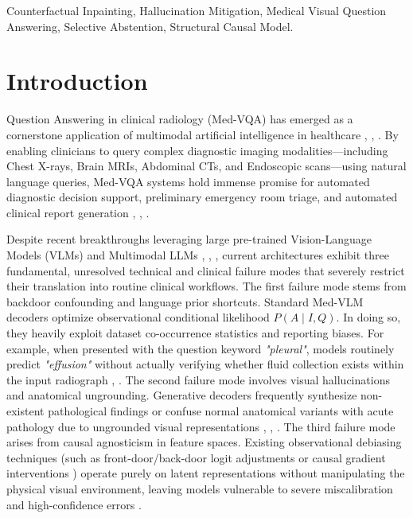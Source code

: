 \documentclass[journal,twoside,web]{ieeecolor}
\begin{document}
\begin{IEEEkeywords}
Counterfactual Inpainting, Hallucination Mitigation, Medical Visual Question Answering, Selective Abstention, Structural Causal Model.
\end{IEEEkeywords}

\section{Introduction}
\label{sec:introduction}
 Question Answering in clinical radiology (Med-VQA) has emerged as a cornerstone application of multimodal artificial intelligence in healthcare \cite{rubin2019}, \cite{hu2024omnimedvqa}, \cite{yu2025finegrained}. By enabling clinicians to query complex diagnostic imaging modalities---including Chest X-rays, Brain MRIs, Abdominal CTs, and Endoscopic scans---using natural language queries, Med-VQA systems hold immense promise for automated diagnostic decision support, preliminary emergency room triage, and automated clinical report generation \cite{gale2020}, \cite{yan2024tokenmixer}, \cite{wang2024chatcadplus}.

Despite recent breakthroughs leveraging large pre-trained Vision-Language Models (VLMs) and Multimodal LLMs \cite{li2022}, \cite{chen2025mimo}, \cite{li2025mvcm}, current architectures exhibit three fundamental, unresolved technical and clinical failure modes that severely restrict their translation into routine clinical workflows. The first failure mode stems from backdoor confounding and language prior shortcuts. Standard Med-VLM decoders optimize observational conditional likelihood $P(A \mid I, Q)$. In doing so, they heavily exploit dataset co-occurrence statistics and reporting biases. For example, when presented with the question keyword \emph{"pleural"}, models routinely predict \emph{"effusion"} without actually verifying whether fluid collection exists within the input radiograph \cite{zhu2025medbiasx}, \cite{wang2024mmql}. The second failure mode involves visual hallucinations and anatomical ungrounding. Generative decoders frequently synthesize non-existent pathological findings or confuse normal anatomical variants with acute pathology due to ungrounded visual representations \cite{liao2025vase}, \cite{heiman2025factchexcker}, \cite{wan2025decoct}. The third failure mode arises from causal agnosticism in feature spaces. Existing observational debiasing techniques (such as front-door/back-door logit adjustments \cite{liu2025cimb} or causal gradient interventions \cite{liu2026decagi}) operate purely on latent representations without manipulating the physical visual environment, leaving models vulnerable to severe miscalibration and high-confidence errors \cite{guo2017}.
\end{document}
